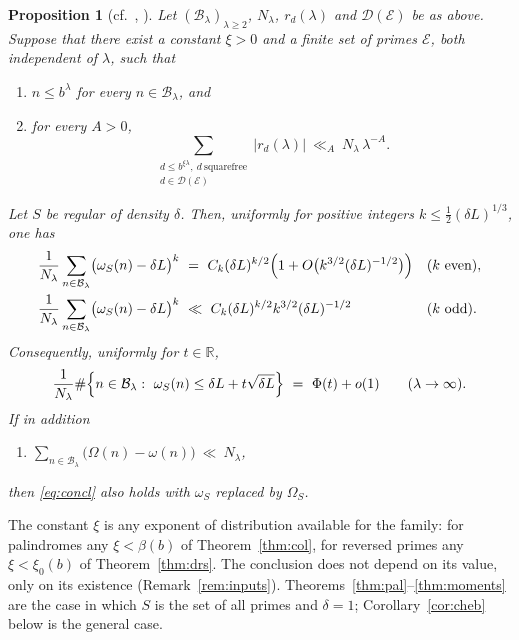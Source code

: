 \documentclass[11pt,a4paper]{article}
\theoremstyle{plain}
\newtheorem{proposition}[theorem]{Proposition}
\theoremstyle{definition}
\numberwithin{equation}{section}
\begin{document}
\begin{proposition}[cf.\ {\cite[Prop.~3]{GS}}, {\cite[Thm.~3]{MMP}}]\label{prop:criterion}
Let $(\mathcal B_\lambda)_{\lambda\ge2}$, $N_\lambda$, $r_d(\lambda)$ and $\mathcal D(\mathcal E)$ be as
above. Suppose that there exist a constant $\xi>0$ and a finite set of primes $\mathcal E$, both
independent of $\lambda$, such that
\begin{enumerate}
\item[\textup{(i)}] $n\le b^{\lambda}$ for every $n\in\mathcal B_\lambda$, and
\item[\textup{(ii)}] for every $A>0$,
\[
\sum_{\substack{d\le b^{\xi\lambda},\ d\ \text{squarefree}\\ d\in\mathcal D(\mathcal E)}}
\bigl|r_d(\lambda)\bigr|\ \ll_A\ N_\lambda\,\lambda^{-A}.
\]
\end{enumerate}
Let $S$ be regular of density $\delta$. Then, uniformly for positive integers
$k\le\frac12(\delta L)^{1/3}$, one has
\begin{equation}\label{eq:momk}
\begin{aligned}
\frac1{N_\lambda}\sum_{n\in\mathcal B_\lambda}\bigl(\omega_S(n)-\delta L\bigr)^{k}
  &\ =\ C_k(\delta L)^{k/2}\Bigl(1+O\bigl(k^{3/2}(\delta L)^{-1/2}\bigr)\Bigr) && (k\ \text{even}),\\
\frac1{N_\lambda}\sum_{n\in\mathcal B_\lambda}\bigl(\omega_S(n)-\delta L\bigr)^{k}
  &\ \ll\ C_k(\delta L)^{k/2}k^{3/2}(\delta L)^{-1/2}                          && (k\ \text{odd}).
\end{aligned}
\end{equation}
Consequently, uniformly for $t\in\mathbb R$,
\begin{equation}\label{eq:concl}
\frac1{N_\lambda}\#\Bigl\{n\in\mathcal B_\lambda:\ \omega_S(n)\le\delta L
+t\sqrt{\delta L}\Bigr\}\ =\ \Phi(t)+o(1)\qquad(\lambda\to\infty).
\end{equation}
If in addition
\begin{enumerate}
\item[\textup{(iii)}] $\displaystyle\sum_{n\in\mathcal B_\lambda}\bigl(\Omega(n)-\omega(n)\bigr)\ \ll\ N_\lambda$,
\end{enumerate}
then \eqref{eq:concl} also holds with $\omega_S$ replaced by $\Omega_S$.
\end{proposition}

The constant $\xi$ is any exponent of distribution available for the family: for palindromes any
$\xi<\beta(b)$ of Theorem~\ref{thm:col}, for reversed primes any $\xi<\xi_0(b)$ of
Theorem~\ref{thm:drs}. The conclusion does not depend on its value, only on its existence
(Remark~\ref{rem:inputs}). Theorems~\ref{thm:pal}--\ref{thm:moments} are the case in which $S$ is the
set of all primes and $\delta=1$; Corollary~\ref{cor:cheb} below is the general case.
\end{document}
